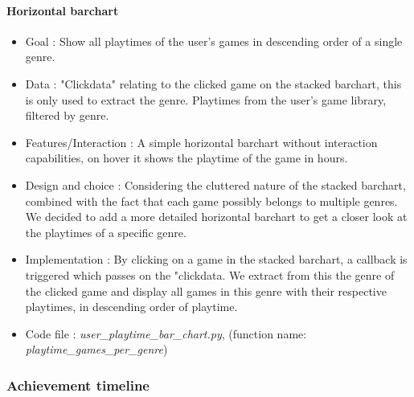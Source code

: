 \documentclass{article}
\begin{document}
        \paragraph{Horizontal barchart}
        
        \begin{itemize}
            \item Goal : Show all playtimes of the user's games in descending order of a single genre.
            \item Data : "Clickdata" relating to the clicked game on the stacked barchart, this is only used to extract the genre. Playtimes from the user's game library, filtered by genre.
            \item Features/Interaction : A simple horizontal barchart without interaction capabilities, on hover it shows the playtime of the game in hours.
            \item Design and choice : Considering the cluttered nature of the stacked barchart, combined with the fact that each game possibly belongs to multiple genres. We decided to add a more detailed horizontal barchart to get a closer look at the playtimes of a specific genre. 
            \item Implementation : By clicking on a game in the stacked barchart, a callback is triggered which passes on the "clickdata. We extract from this the genre of the clicked game and display all games in this genre with their respective playtimes, in descending order of playtime.
            \item Code file : \textit{user\_playtime\_bar\_chart.py}, (function name: \textit{playtime\_games\_per\_genre})
        \end{itemize}
        
    \subsubsection{Achievement timeline}
    
\end{document}
